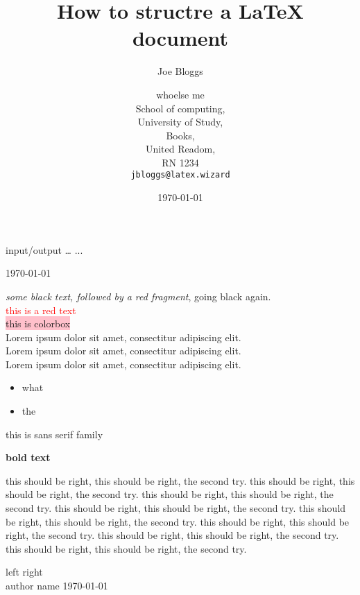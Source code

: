 \documentclass{article}
\title{How to structre a \LaTeX{} document}
\author{Joe Bloggs \and whoelse me \\
        School of computing, \\
        University of Study, \\
        Books, \\
        United Readom, \\
        RN 1234\\
        \texttt{jbloggs@latex.wizard}}
\date{\today}
\begin{document}
\maketitle
\vfill
\tableofcontents

input\slash output
\ldots
...

\today

\emph{some black text, \color{red} followed by a red fragment}, going black again. \\
\textcolor{red} {this is a red text} \\
\colorbox{pink}{this is colorbox} \\

Lorem ipsum dolor sit amet, consectitur adipiscing elit. \\
\renewcommand*\rmdefault{pag}
Lorem ipsum dolor sit amet, consectitur adipiscing elit. \\
\renewcommand*\rmdefault{iwona}
Lorem ipsum dolor sit amet, consectitur adipiscing elit. \\

\begin{itemize}
   \item what
   \item the
\end{itemize}

\textsf{this is sans serif family}

\begin{center}
    \textbf{bold text}
\end{center}


this should be right, this should be right, the second try.
this should be right, this should be right, the second try.
this should be right, this should be right, the second try.
this should be right, this should be right, the second try.
this should be right, this should be right, the second try.
this should be right, this should be right, the second try.
this should be right, this should be right, the second try.
this should be right, this should be right, the second try.

\noindent left \hfill right \\
\noindent author name \hfill \today
\end{document}
